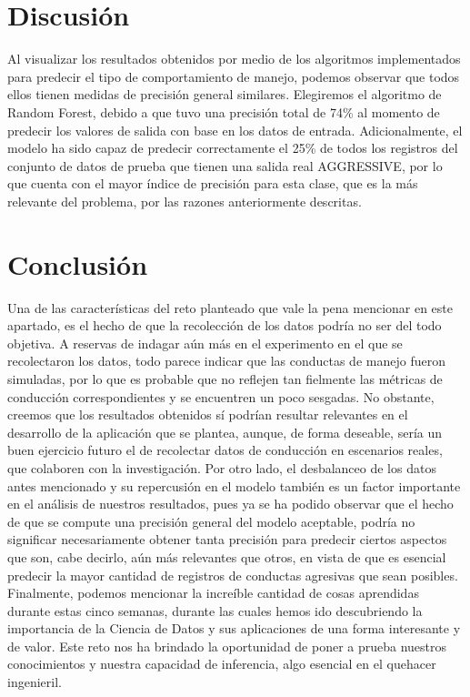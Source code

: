 \documentclass[spanish,12pt,letterpaper]{article}
\begin{document}
\section{Discusión}
    Al visualizar los resultados obtenidos por medio de los algoritmos implementados para predecir el tipo de comportamiento de manejo, podemos observar que todos ellos tienen medidas de precisión general similares. Elegiremos el algoritmo de Random Forest, debido a que tuvo una precisión total de 74\% al momento de predecir los valores de salida con base en los datos de entrada. Adicionalmente, el modelo ha sido capaz de predecir correctamente el 25\% de todos los registros del conjunto de datos de prueba que tienen una salida real AGGRESSIVE, por lo que cuenta con el mayor índice de precisión para esta clase, que es la más relevante del problema, por las razones anteriormente descritas.

\section{Conclusión}
Una de las características del reto planteado que vale la pena mencionar en este apartado, es el hecho de que la recolección de los datos podría no ser del todo objetiva. A reservas de indagar aún más en el experimento en el que se recolectaron los datos, todo parece indicar que las conductas de manejo fueron simuladas, por lo que es probable que no reflejen tan fielmente las métricas de conducción correspondientes y se encuentren un poco sesgadas. No obstante, creemos que los resultados obtenidos sí podrían resultar relevantes en el desarrollo de la aplicación que se plantea, aunque, de forma deseable, sería un buen ejercicio futuro el de recolectar datos de conducción en escenarios reales, que colaboren con la investigación.
Por otro lado, el desbalanceo de los datos antes mencionado y su repercusión en el modelo también es un factor importante en el análisis de nuestros resultados, pues ya se ha podido observar que el hecho de que se compute una precisión general del modelo aceptable, podría no significar necesariamente obtener tanta precisión para predecir ciertos aspectos que son, cabe decirlo, aún más relevantes que otros, en vista de que es esencial predecir la mayor cantidad de registros de conductas agresivas que sean posibles.
Finalmente, podemos mencionar la increíble cantidad de cosas aprendidas durante estas cinco semanas, durante las cuales hemos ido descubriendo la importancia de la Ciencia de Datos y sus aplicaciones de una forma interesante y de valor. Este reto nos ha brindado la oportunidad de poner a prueba nuestros conocimientos y nuestra capacidad de inferencia, algo esencial en el quehacer ingenieril.
\end{document}
